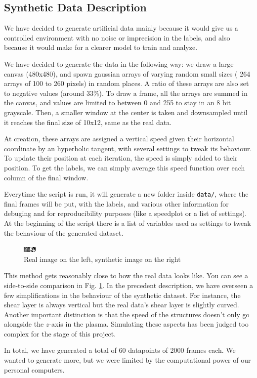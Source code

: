 \documentclass[10pt,conference]{IEEEtran}
\begin{document}
\subsection{Synthetic Data Description}
We have decided to generate artificial data mainly because it would give us a controlled environment with no noise or imprecision in the labels, and also because it would make for a clearer model to train and analyze.\par
We have decided to generate the data in the following way: we draw a large canvas (480x480), and spawn gaussian arrays of varying random small sizes ( 264 arrays of 100 to 260 pixels) in random places. A ratio of these arrays are also set to negative values (around 33\%). To draw a frame, all the arrays are summed in the canvas, and values are limited to between 0 and 255 to stay in an 8 bit grayscale. Then, a smaller window at the center is taken and downsampled until it reaches the final size of 10x12, same as the real data.\par
At creation, these arrays are assigned a vertical speed given their horizontal coordinate by an hyperbolic tangent, with several settings to tweak its behaviour. To update their position at each iteration, the speed is simply added to their position. To get the labels, we can simply average this speed function over each column of the final window.\par
Everytime the script is run, it will generate a new folder inside \texttt{data/}, where the final frames will be put, with the labels, and various other information for debuging and for reproducibility purposes (like a speedplot or a list of settings).
At the beginning of the script there is a list of variables used as settings to tweak the behaviour of the generated dataset.
 
\begin{figure}
  \centering
  \includegraphics[scale=5]{images/comparison.png}
  \caption{Real image on the left, synthetic image on the right}
\label{comparison}
\end{figure}
 
This method gets reasonably close to how the real data looks like. You can see a side-to-side comparison in Fig. \ref{comparison}. In the precedent description, we have overseen a few simplifications in the behaviour of the synthetic dataset. For instance, the shear layer is always vertical but the real data's shear layer is slightly curved. Another important distinction is that the speed of the structures doesn't only go alongside the $z$-axis in the plasma. Simulating these aspects has been judged too complex for the stage of this project.\par
In total, we have generated a total of 60 datapoints of 2000 frames each. We wanted to generate more, but we were limited by the computational power of our personal computers.
\end{document}
